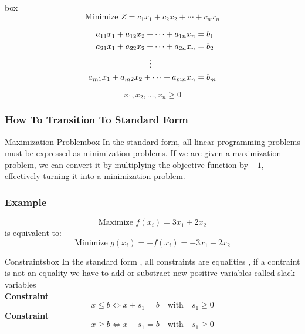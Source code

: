\begin{prettyBox}{}{box}
\[
    \text{Minimize } Z = c_1x_1 + c_2x_2 + \cdots + c_nx_n
\]

\vspace{0.25cm}
\hspace{1cm}
\[
\begin{aligned}
    a_{11}x_1 + a_{12}x_2 + \cdots + a_{1n}x_n &= b_1 \\
    a_{21}x_1 + a_{22}x_2 + \cdots + a_{2n}x_n &= b_2 \\
    &\hspace{-2cm}\vdots \\
    a_{m1}x_1 + a_{m2}x_2 + \cdots + a_{mn}x_n &= b_m
\end{aligned}
\]

\[
x_1, x_2, \dots, x_n \geq 0 
\]
\end{prettyBox}

\subsubsection{How To Transition To Standard Form}


\begin{prettyBox}{Maximization Problem}{box}
In the standard form, all linear programming problems must be expressed as minimization problems. If we are given a maximization problem, we can convert it by multiplying the objective function by \(-1\), effectively turning it into a minimization problem.
\end{prettyBox}

\subsubsection*{\underline{Example}}
\[
\text{Maximize } f(x_i) = 3x_1 + 2x_2
\]
is equivalent to:
\[
\text{Minimize } g(x_i) = -f(x_i) = -3x_1 - 2x_2
\]

\vspace{0.5cm}
\begin{prettyBox}{Constraints}{box}
In the standard form , all constraints are equalities , if a contraint is not an equality
we have to add or substract new positive variables called slack variables\\[0.25cm]
\boldsymbol{\leq} \textbf{Constraint}
\begin{equation*}
x \leq b \Leftrightarrow x + s_1 = b \quad \text{with} \quad s_1 \geq 0
\end{equation*}
\boldsymbol{\geq} \textbf{Constraint}
\begin{equation*}
    x\geq b \Leftrightarrow x-s_1=b \quad \text{with} \quad s_1\geq 0
\end{equation*}
\end{prettyBox}


